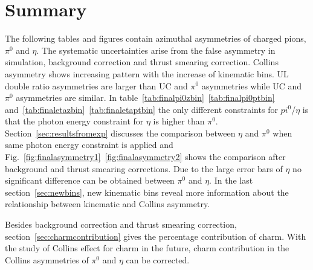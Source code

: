 \section{Summary}

The following tables and figures contain azimuthal asymmetries of charged pions, $\pi^0$ and $\eta$. The systematic uncertainties arise from the false asymmetry in simulation, background correction and thrust smearing correction. Collins asymmetry shows increasing pattern with the increase of kinematic bins. UL double ratio asymmetries are larger than UC and $\pi^0$ asymmetries while UC and $\pi^0$ asymmetries are similar. In table~\ref{tab:finalpi0zbin}~\ref{tab:finalpi0ptbin} and~\ref{tab:finaletazbin}~\ref{tab:finaletaptbin} the only different constraints for $pi^0$/$\eta$ is that the photon energy constraint for $\eta$ is higher than $\pi^0$. Section~\ref{sec:resultsfromexp} discusses the comparison between $\eta$ and $\pi^0$ when same photon energy constraint is applied and Fig.~\ref{fig:finalasymmetry1}~\ref{fig:finalasymmetry2} shows the comparison after background and thrust smearing corrections. Due to the large error bars of $\eta$ no significant difference can be obtained between $\pi^0$ and $\eta$. In the last section~\ref{sec:newbins}, new kinematic bins reveal more information about the relationship between kinematic and Collins asymmetry. 

Besides background correction and thrust smearing correction, section~\ref{sec:charmcontribution} gives the percentage contribution of charm. With the study of Collins effect for charm in the future, charm contribution in the Collins asymmetries of $\pi^0$ and $\eta$ can be corrected. 


